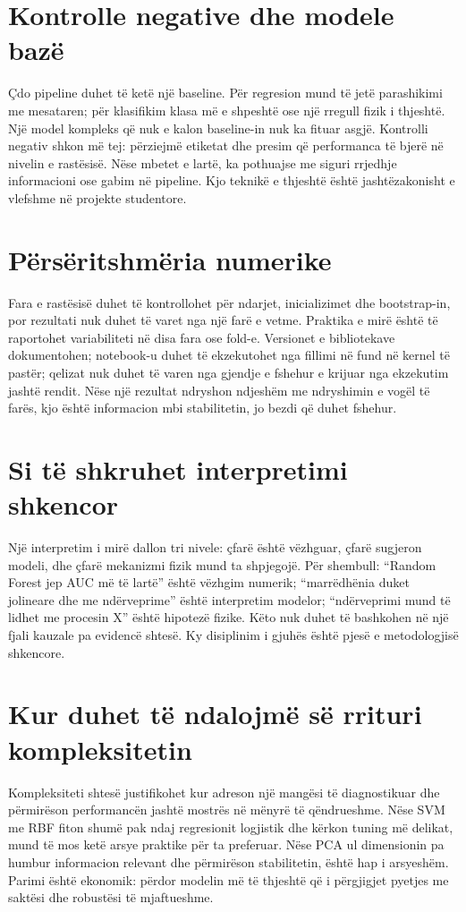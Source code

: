 \documentclass[12pt,a4paper,oneside]{book}
\begin{document}
\section{Kontrolle negative dhe modele bazë}
Çdo pipeline duhet të ketë një baseline. Për regresion mund të jetë parashikimi me mesataren; për klasifikim klasa më e shpeshtë ose një rregull fizik i thjeshtë. Një model kompleks që nuk e kalon baseline-in nuk ka fituar asgjë. Kontrolli negativ shkon më tej: përziejmë etiketat dhe presim që performanca të bjerë në nivelin e rastësisë. Nëse mbetet e lartë, ka pothuajse me siguri rrjedhje informacioni ose gabim në pipeline. Kjo teknikë e thjeshtë është jashtëzakonisht e vlefshme në projekte studentore.

\section{Përsëritshmëria numerike}
Fara e rastësisë duhet të kontrollohet për ndarjet, inicializimet dhe bootstrap-in, por rezultati nuk duhet të varet nga një farë e vetme. Praktika e mirë është të raportohet variabiliteti në disa fara ose fold-e. Versionet e bibliotekave dokumentohen; notebook-u duhet të ekzekutohet nga fillimi në fund në kernel të pastër; qelizat nuk duhet të varen nga gjendje e fshehur e krijuar nga ekzekutim jashtë rendit. Nëse një rezultat ndryshon ndjeshëm me ndryshimin e vogël të farës, kjo është informacion mbi stabilitetin, jo bezdi që duhet fshehur.

\section{Si të shkruhet interpretimi shkencor}
Një interpretim i mirë dallon tri nivele: çfarë është vëzhguar, çfarë sugjeron modeli, dhe çfarë mekanizmi fizik mund ta shpjegojë. Për shembull: “Random Forest jep AUC më të lartë” është vëzhgim numerik; “marrëdhënia duket jolineare dhe me ndërveprime” është interpretim modelor; “ndërveprimi mund të lidhet me procesin X” është hipotezë fizike. Këto nuk duhet të bashkohen në një fjali kauzale pa evidencë shtesë. Ky disiplinim i gjuhës është pjesë e metodologjisë shkencore.

\section{Kur duhet të ndalojmë së rrituri kompleksitetin}
Kompleksiteti shtesë justifikohet kur adreson një mangësi të diagnostikuar dhe përmirëson performancën jashtë mostrës në mënyrë të qëndrueshme. Nëse SVM me RBF fiton shumë pak ndaj regresionit logjistik dhe kërkon tuning më delikat, mund të mos ketë arsye praktike për ta preferuar. Nëse PCA ul dimensionin pa humbur informacion relevant dhe përmirëson stabilitetin, është hap i arsyeshëm. Parimi është ekonomik: përdor modelin më të thjeshtë që i përgjigjet pyetjes me saktësi dhe robustësi të mjaftueshme.
\end{document}
